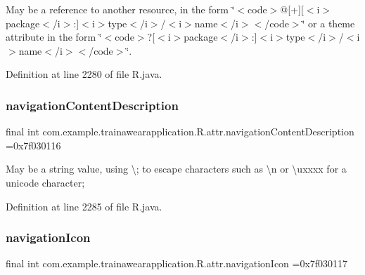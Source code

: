 May be a reference to another resource, in the form \char`\"{}$<$code$>$@\mbox{[}+\mbox{]}\mbox{[}$<$i$>$package$<$/i$>$\+:\mbox{]}$<$i$>$type$<$/i$>$/$<$i$>$name$<$/i$>$$<$/code$>$\char`\"{} or a theme attribute in the form \char`\"{}$<$code$>$?\mbox{[}$<$i$>$package$<$/i$>$\+:\mbox{]}$<$i$>$type$<$/i$>$/$<$i$>$name$<$/i$>$$<$/code$>$\char`\"{}. 

Definition at line 2280 of file R.\+java.

\mbox{\label{classcom_1_1example_1_1trainawearapplication_1_1_r_1_1attr_a05e4b01fb1ae2e7c167c60a9f1691c33}} 
\subsubsection{\texorpdfstring{navigationContentDescription}{navigationContentDescription}}
{\footnotesize\ttfamily final int com.\+example.\+trainawearapplication.\+R.\+attr.\+navigation\+Content\+Description =0x7f030116\hspace{0.3cm}{\ttfamily [static]}}

May be a string value, using \textquotesingle{}\textbackslash{};\textquotesingle{} to escape characters such as \textquotesingle{}\textbackslash{}n\textquotesingle{} or \textquotesingle{}\textbackslash{}uxxxx\textquotesingle{} for a unicode character; 

Definition at line 2285 of file R.\+java.

\mbox{\label{classcom_1_1example_1_1trainawearapplication_1_1_r_1_1attr_af1c806903f1c7e9e81cc5f7a8687ce01}} 
\subsubsection{\texorpdfstring{navigationIcon}{navigationIcon}}
{\footnotesize\ttfamily final int com.\+example.\+trainawearapplication.\+R.\+attr.\+navigation\+Icon =0x7f030117\hspace{0.3cm}{\ttfamily [static]}}

